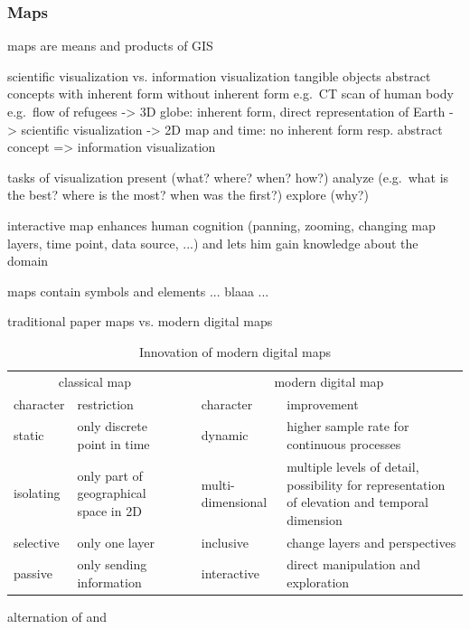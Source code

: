 \subsubsection{Maps} %
\label{ssub:maps}


maps are means and products of GIS

scientific visualization vs. information visualization
  tangible objects            abstract concepts
  with inherent form          without inherent form
  e.g.\ CT scan of human body  e.g.\ flow of refugees
-> 3D globe: inherent form, direct representation of Earth -> scientific visualization
-> 2D map and time: no inherent form resp. abstract concept
=> information visualization

tasks of visualization
  present (what? where? when? how?)
  analyze (e.g.\ what is the best? where is the most? when was the first?)
  explore (why?)

interactive map enhances human cognition (panning, zooming, changing map layers, time point, data source, ...) and lets him gain knowledge about the domain

maps contain symbols and elements
  ... blaaa ...

traditional paper maps vs. modern digital maps
\begin{table}[ht]
\centering
\begin{tabular}{llp{1em}ll}
    \toprule
    \multicolumn{2}{c}{classical map} & & \multicolumn{2}{c}{modern digital map} \\
    character & restriction & & character & improvement \\
    \midrule
    static & only discrete point in time & & dynamic & higher sample rate for continuous processes \\
    isolating & only part of geographical space in 2D & & multi-dimensional & multiple levels of detail, possibility for representation of elevation and temporal dimension \\
    selective & only one layer & & inclusive & change layers and perspectives \\
    passive & only sending information & & interactive & direct manipulation and exploration \\
    \bottomrule
\end{tabular}
\caption{Innovation of modern digital maps}
\small{alternation of \cite{karcher} and \cite[p. 145]{ott2001time}}
\label{tab:maps_restrictions}
\end{table}

